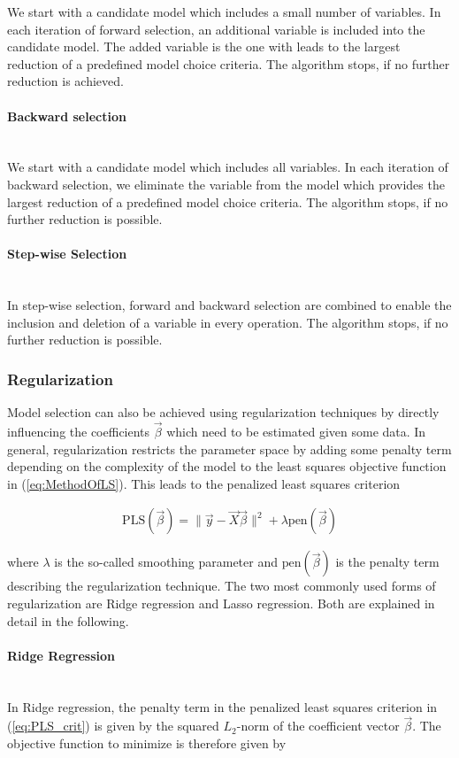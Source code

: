 \documentclass[10pt,a4paper]{report}
\newcommand{\subsubsubsection}[1]{\paragraph{#1}\mbox{}\\}
\begin{document}
We start with a candidate model which includes a small number of variables. In each iteration of forward selection, an additional variable is included into the candidate model.  The added variable is the one with leads to the largest reduction of a predefined model choice criteria. The algorithm stops, if no further reduction is achieved.

\subsubsubsection{Backward selection}

We start with a candidate model which includes all variables. In each iteration of backward selection, we eliminate the variable from the model which provides the largest reduction of a predefined model choice criteria. The algorithm stops, if no further reduction is possible. 

\subsubsubsection{Step-wise Selection}

In step-wise selection, forward and backward selection are combined to enable the inclusion and deletion of a variable in every operation. The algorithm stops, if no further reduction is possible.

\subsubsection{Regularization} \label{subsubsec:Regularization}

Model selection can also be achieved using regularization techniques by directly influencing the coefficients $\vec{\beta}$ which need to be estimated given some data. In general, regularization restricts the parameter space by adding some penalty term depending on the complexity of the model to the least squares objective function in (\ref{eq:MethodOfLS}). This leads to the penalized least squares criterion

\begin{align} \label{eq:PLS_crit}
	\text{PLS}(\vec{\beta}) = \lVert \vec{y} - \vec{X} \vec{\beta}\rVert^2 + \lambda \text{pen}(\vec{\beta})
\end{align}

where $\lambda$ is the so-called smoothing parameter and $\text{pen}(\vec{\beta})$ is the penalty term describing the regularization technique. The two most commonly used forms of regularization are Ridge regression and Lasso regression. Both are explained in detail in the following.

\subsubsubsection{Ridge Regression}

In Ridge regression, the penalty term in the penalized least squares criterion in (\ref{eq:PLS_crit}) is given by the squared $L_2$-norm of the coefficient vector $\vec{\beta}$. The objective function to minimize is therefore given by
\end{document}
